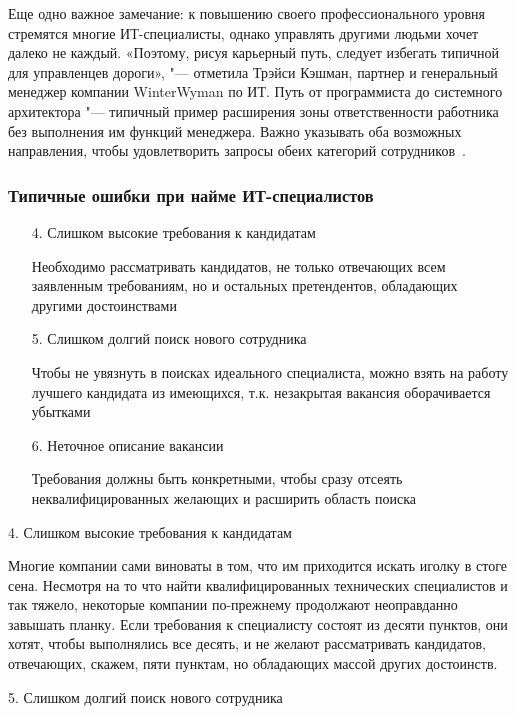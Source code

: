 \documentclass{../industrial-development}
\begin{document}
Еще одно важное замечание: к повышению своего профессионального уровня стремятся многие ИТ-специалисты, однако управлять другими людьми хочет далеко не каждый. «Поэтому, рисуя карьерный путь, следует избегать типичной для управленцев дороги», "--- отметила Трэйси Кэшман, партнер и генеральный менеджер компании WinterWyman по ИТ. Путь от программиста до системного архитектора "--- типичный пример расширения зоны ответственности работника без выполнения им функций менеджера. Важно указывать оба возможных направления, чтобы удовлетворить запросы обеих категорий сотрудников~\cite{RichHein}.

\begin{frame} \frametitle{Типичные ошибки при найме ИТ-специалистов}
  \begin{itemize}
\item[4.] Слишком высокие требования к кандидатам

{\small Необходимо рассматривать кандидатов, не только отвечающих всем заявленным требованиям, но и остальных претендентов, обладающих другими достоинствами} 

\item[5.] Слишком долгий поиск нового сотрудника

{\small Чтобы не увязнуть в поисках идеального специалиста, можно взять на работу лучшего кандидата из имеющихся, т.к. незакрытая вакансия оборачивается убытками}

\item[6.] Неточное описание вакансии

{\small Требования должны быть конкретными, чтобы сразу отсеять неквалифицированных желающих и расширить область поиска}
 \end{itemize}

\end{frame}

\lecturenotes

4. \alert{Слишком высокие требования к кандидатам}

Многие компании сами виноваты в том, что им приходится искать иголку в стоге сена. Несмотря на то что найти квалифицированных технических специалистов и так тяжело, некоторые компании по-прежнему продолжают неоправданно завышать планку. Если требования к специалисту состоят из десяти пунктов, они хотят, чтобы выполнялись все десять, и не желают рассматривать кандидатов, отвечающих, скажем, пяти пунктам, но обладающих массой других достоинств.

5. \alert{Слишком долгий поиск нового сотрудника}
\end{document}
